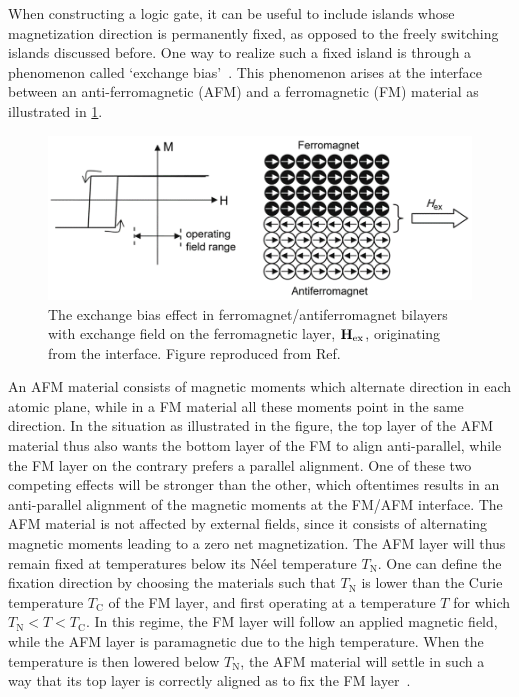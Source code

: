 \documentclass[11pt,a4paper,english]{article}
\begin{document}
When constructing a logic gate, it can be useful to include islands whose magnetization direction is permanently fixed, as opposed to the freely switching islands discussed before. One way to realize such a fixed island is through a phenomenon called `exchange bias'~\cite{ExchangeBias_Mechanisms,ExchangeBias_nanostructures,ExchangeBias,syllabus_PoAEaPD}. This phenomenon arises at the interface between an anti-ferromagnetic (AFM) and a ferromagnetic (FM) material as illustrated in \cref{fig:Intro_ExchangeBias}.
\begin{figure}[t]
    \centering
    \includegraphics[width=0.8\columnwidth]{Figures/Introduction/Syallabus_PoAEaPD - Figure 2.7.png}
    \caption{The exchange bias effect in ferromagnet/antiferromagnet bilayers with exchange field on the ferromagnetic layer, $\vb{H_\mathrm{ex}}$, originating from the interface. Figure reproduced from Ref.~\cite{syllabus_PoAEaPD,Syllabus_PoAEaPD_C2_Ref1}}
    \label{fig:Intro_ExchangeBias}
\end{figure}
An AFM material consists of magnetic moments which alternate direction in each atomic plane, while in a FM material all these moments point in the same direction. In the situation as illustrated in the figure, the top layer of the AFM material thus also wants the bottom layer of the FM to align anti-parallel, while the FM layer on the contrary prefers a parallel alignment. One of these two competing effects will be stronger than the other, which oftentimes results in an anti-parallel alignment of the magnetic moments at the FM/AFM interface. The AFM material is not affected by external fields, since it consists of alternating magnetic moments leading to a zero net magnetization. The AFM layer will thus remain fixed at temperatures below its N\'{e}el temperature $T_\mathrm{N}$. One can define the fixation direction by choosing the materials such that $T_\mathrm{N}$ is lower than the Curie temperature $T_\mathrm{C}$ of the FM layer, and first operating at a temperature $T$ for which $T_\mathrm{N} < T < T_\mathrm{C}$. In this regime, the FM layer will follow an applied magnetic field, while the AFM layer is paramagnetic due to the high temperature. When the temperature is then lowered below $T_\mathrm{N}$, the AFM material will settle in such a way that its top layer is correctly aligned as to fix the FM layer~\cite{ExchangeBias_Mechanisms}. \par
\end{document}

